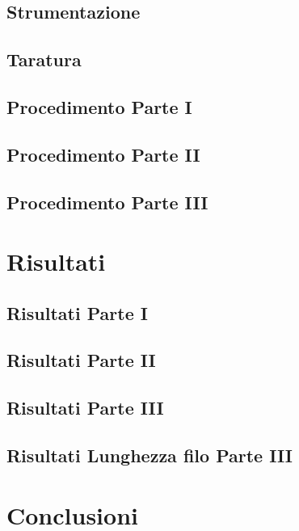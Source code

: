 \documentclass[a4paper,10pt,oneside]{memoir}
\begin{document}
\subsection{Strumentazione}

\subsection{Taratura}

\subsection{Procedimento Parte I}

\subsection{Procedimento Parte II}


\subsection{Procedimento Parte III}

\newpage
\section{Risultati}
\subsection{Risultati Parte I}


\subsection{Risultati Parte II}


\subsection{Risultati Parte III}

\newpage
\subsection{Risultati Lunghezza filo Parte III}

\section{Conclusioni}

\end{document}
